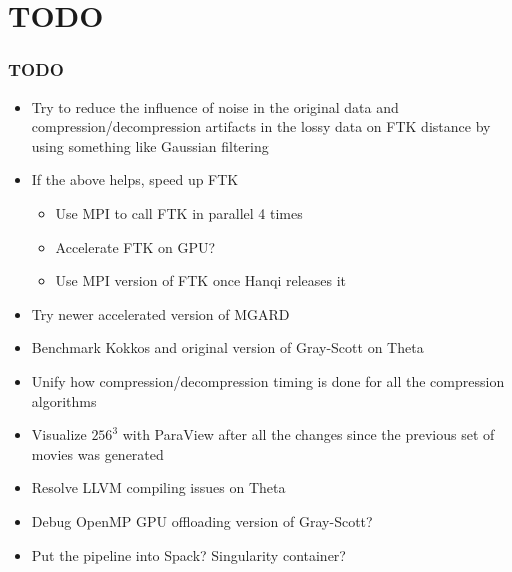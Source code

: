 \section{TODO}

\begin{frame}[fragile]
  \frametitle{TODO}
  \begin{itemize}
  \item Try to reduce the influence of noise in the original data and compression/decompression artifacts in the lossy data
    on FTK distance by using something like Gaussian filtering
  \item If the above helps, speed up FTK
    \begin{itemize}
    \item Use MPI to call FTK in parallel 4 times
    \item Accelerate FTK on GPU?
    \item Use MPI version of FTK once Hanqi releases it
    \end{itemize}
  \item Try newer accelerated version of MGARD
  \item Benchmark Kokkos and original version of Gray-Scott on Theta
  \item Unify how compression/decompression timing is done for all the compression algorithms
  \item Visualize $256^3$ with ParaView after all the changes since the previous set of movies was generated
  \item Resolve LLVM compiling issues on Theta
  \item Debug OpenMP GPU offloading version of Gray-Scott?
  \item Put the pipeline into Spack? Singularity container?
  \end{itemize}
\end{frame}
